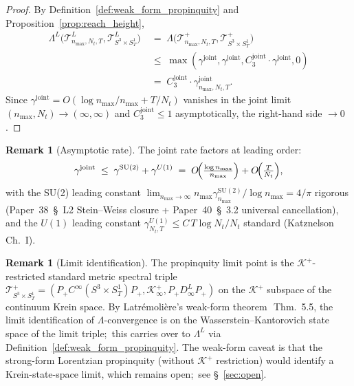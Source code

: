 \documentclass[11pt,a4paper]{article}
\theoremstyle{plain}
\theoremstyle{definition}
\newtheorem{remark}[theorem]{Remark}
\newcommand{\nmax}{n_{\max}}
\newcommand{\Nt}{N_{t}}
\newcommand{\Manifold}{S^{3}\times S^{1}_{T}}
\newcommand{\Krein}{\mathcal{K}}
\newcommand{\Tcal}{\mathcal{T}}
\newcommand{\SU}{\mathrm{SU}}
\newcommand{\Uone}{U(1)}
\newcommand{\Lprop}{\Lambda^{L}}
\newcommand{\Lambdab}{\Lambda}
\newcommand{\gammajoint}{\gamma^{\mathrm{joint}}}
\newcommand{\gammaSU}{\gamma^{\SU(2)}}
\newcommand{\gammaU}{\gamma^{\Uone}}
\newcommand{\Cthreejoint}{C_{3}^{\mathrm{joint}}}
\newcommand{\Kplus}{\Krein^{+}}
\newcommand{\Pplus}{P_{+}}
\begin{document}
\begin{proof}
By Definition~\ref{def:weak_form_propinquity} and
Proposition~\ref{prop:reach_height},
\begin{align*}
   \Lprop\!\bigl(\Tcal^{L}_{\nmax,\Nt,T}, \Tcal^{L}_{\Manifold}\bigr)
   \;&=\; \Lambdab\!\bigl(\Tcal^{+}_{\nmax,\Nt,T}, \Tcal^{+}_{\Manifold}\bigr) \\
   \;&\le\; \max(\gammajoint, \gammajoint, \Cthreejoint \cdot \gammajoint, 0) \\
   \;&=\; \Cthreejoint \cdot \gammajoint_{\nmax, \Nt, T}.
\end{align*}
Since $\gammajoint = O(\log\nmax/\nmax + T/\Nt)$ vanishes in the joint
limit $(\nmax, \Nt) \to (\infty, \infty)$ and $\Cthreejoint \le 1$
asymptotically, the right-hand side $\to 0$. \qedhere
\end{proof}

\begin{remark}[Asymptotic rate]\label{rem:asymp_rate}
The joint rate factors at leading order:
\begin{equation*}
   \gammajoint \;\le\; \gammaSU + \gammaU
   \;=\; O\!\Bigl(\tfrac{\log\nmax}{\nmax}\Bigr) + O\!\Bigl(\tfrac{T}{\Nt}\Bigr),
\end{equation*}
with the SU(2) leading constant
$\lim_{\nmax\to\infty} \nmax \gammaSU_{\nmax} / \log\nmax = 4/\pi$
rigorous (Paper~38~\S~L2 Stein--Weiss closure + Paper~40~\S~3.2
universal cancellation), and the $\Uone$ leading constant
$\gammaU_{\Nt, T} \le C\, T \log\Nt / \Nt$ standard
(Katznelson~\cite{katznelson2004}\,Ch.~I).
\end{remark}

\begin{remark}[Limit identification]\label{rem:limit_identification}
The propinquity limit point is the $\Kplus$-restricted standard metric
spectral triple $\Tcal^{+}_{\Manifold} = (\Pplus C^{\infty}(\Manifold)
\Pplus, \Kplus_{\infty}, \Pplus D^{L}_{\infty} \Pplus)$ on the
$\Kplus$ subspace of the continuum Krein space. By Latr\'emoli\`ere's
weak-form theorem~\cite{latremoliere_metric_st_2017}\,Thm.~5.5, the
limit identification of $\Lambdab$-convergence is on the
Wasserstein--Kantorovich state space of the limit triple;\ this carries
over to $\Lprop$ via Definition~\ref{def:weak_form_propinquity}. The
weak-form caveat is that the strong-form Lorentzian propinquity (without
$\Kplus$ restriction) would identify a Krein-state-space limit, which
remains open;\ see \S~\ref{sec:open}.
\end{remark}
\end{document}
